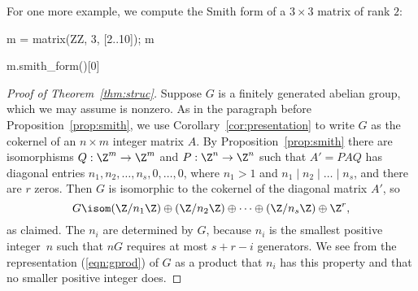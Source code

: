 \begin{example}
For one more example, we compute the Smith form of a
$3\times 3$ matrix of rank $2$:
\begin{sagecode}
\begin{sagecell}
m = matrix(ZZ, 3, [2..10]); m
\end{sagecell}
\begin{sageout}
[ 2  3  4]
[ 5  6  7]
[ 8  9 10]
\end{sageout}
\begin{sagecell}
m.smith_form()[0]
\end{sagecell}
\begin{sageout}
[1 0 0]
[0 3 0]
[0 0 0]
\end{sageout}
\end{sagecode}
\end{example}


\begin{proof}[Proof of Theorem~\ref{thm:struc}]
	Suppose $G$ is a finitely generated abelian group, which we may assume
	is nonzero.  As in the paragraph before Proposition~\ref{prop:smith},
	we use Corollary~\ref{cor:presentation} to write $G$ as the cokernel
	of an $n\times m$ integer matrix $A$.  By Proposition~\ref{prop:smith}
	there are isomorphisms $Q:\Z^m\to \Z^m$ and $P:\Z^n\to \Z^n$ such that
	$A'=PAQ$ has diagonal entries $n_1, n_2,\ldots,
	n_s,0,\ldots,0$, where $n_1>1$ and $n_1\mid n_2 \mid{} \ldots \mid{}
	n_s$, and there are $r$ zeros.  Then $G$ is isomorphic to the cokernel of the diagonal matrix
	$A'$, so
	\begin{equation}\label{eqn:gprod}
		G \isom (\Z/n_1\Z) \oplus (\Z/n_2\Z)
		\oplus \cdots \oplus (\Z/n_s\Z) \oplus \Z^{r},
	\end{equation}
	as claimed.  The $n_i$ are determined by $G$, because $n_i$ is the
	smallest positive integer~$n$ such that $nG$ requires at most $s+r-i$
	generators. We see from the representation (\ref{eqn:gprod}) of $G$ as
	a product that $n_i$ has this property and that no smaller positive
	integer does.
\end{proof}

